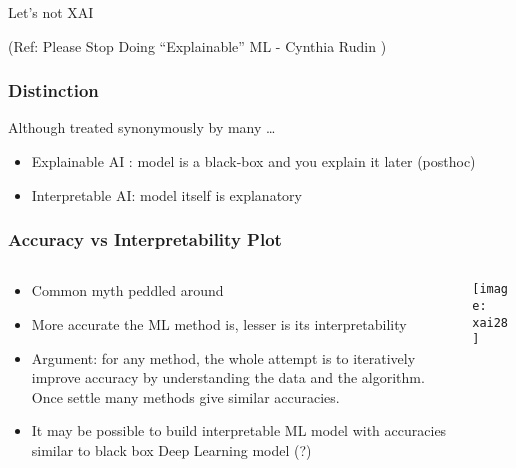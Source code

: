 \begin{frame}[fragile]\frametitle{}
\begin{center}
{\Large Let's not XAI}

\tiny{(Ref: Please Stop Doing ``Explainable'' ML - Cynthia Rudin  )}

\end{center}
\end{frame}

\begin{frame}[fragile]\frametitle{Distinction}

Although treated synonymously by many \ldots

\begin{itemize}
\item Explainable AI : model is a black-box and you explain it later (posthoc)
\item Interpretable AI: model itself is explanatory
\end{itemize}

\end{frame}

\begin{frame}[fragile]\frametitle{Accuracy vs Interpretability Plot}



\begin{columns}
    \begin{column}[T]{0.6\linewidth}
		
			\begin{itemize}
			\item Common myth peddled around
			\item More accurate the ML method is, lesser is its interpretability
			\item Argument: for any method, the whole attempt is to iteratively improve accuracy by understanding the data and the algorithm. Once settle many methods give similar accuracies.
			\item It may be possible to build interpretable ML model with accuracies similar to black box Deep Learning model (?)
			\end{itemize}
			
    \end{column}
    \begin{column}[T]{0.4\linewidth}

      \begin{center}
      \texttt{[image: xai28]}
	  	\end{center}
    \end{column}
  \end{columns}

\end{frame}

